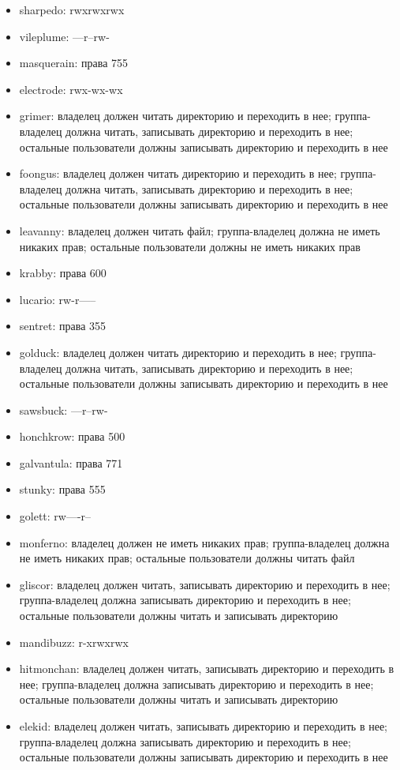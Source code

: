 \documentclass{article}
\begin{document}
\begin{itemize}
  \item sharpedo: rwxrwxrwx
  \item vileplume: ---r--rw-
  \item masquerain: права 755
  \item electrode: rwx-wx-wx
  \item grimer: владелец должен читать директорию и переходить в нее; группа-владелец должна читать, записывать директорию и переходить в нее; остальные пользователи должны записывать директорию и переходить в нее
  \item foongus: владелец должен читать директорию и переходить в нее; группа-владелец должна читать, записывать директорию и переходить в нее; остальные пользователи должны записывать директорию и переходить в нее
  \item leavanny: владелец должен читать файл; группа-владелец должна не иметь никаких прав; остальные пользователи должны не иметь никаких прав
  \item krabby: права 600
  \item lucario: rw-r-----
  \item sentret: права 355
  \item golduck: владелец должен читать директорию и переходить в нее; группа-владелец должна читать, записывать директорию и переходить в нее; остальные пользователи должны записывать директорию и переходить в нее
  \item sawsbuck: ---r--rw-
  \item honchkrow: права 500
  \item galvantula: права 771
  \item stunky: права 555
  \item golett: rw----r--
  \item monferno: владелец должен не иметь никаких прав; группа-владелец должна не иметь никаких прав; остальные пользователи должны читать файл
  \item gliscor: владелец должен читать, записывать директорию и переходить в нее; группа-владелец должна записывать директорию и переходить в нее; остальные пользователи должны читать и записывать директорию
  \item mandibuzz: r-xrwxrwx
  \item hitmonchan: владелец должен читать, записывать директорию и переходить в нее; группа-владелец должна записывать директорию и переходить в нее; остальные пользователи должны читать и записывать директорию
  \item elekid: владелец должен читать, записывать директорию и переходить в нее; группа-владелец должна записывать директорию и переходить в нее; остальные пользователи должны записывать директорию и переходить в нее

\end{itemize}
\end{document}

